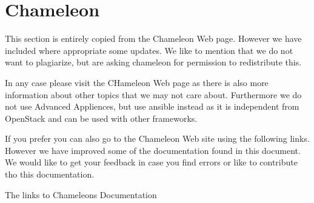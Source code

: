 
%


\part{Chameleon}

This section is entirely copied from the Chameleon Web page. However
we have included where appropriate some updates. We like to mention
that we do not want to plagiarize, but are asking chameleon for
permission to redistribute this.

In any case please visit the CHameleon Web page as there is also more
information about other topics that we may not care about. Furthermore
we do not use Advanced Appliences, but use ansible instead as it is
independent from OpenStack and can be used with other frameworks.

If you prefer you can also go to the Chameleon Web site using the
following links. However we have improved some of the documentation
found in this document. We would like to get your feedback in case you
find errors or like to contribute tho this documentation.

The links to Chameleons Documentation 












%